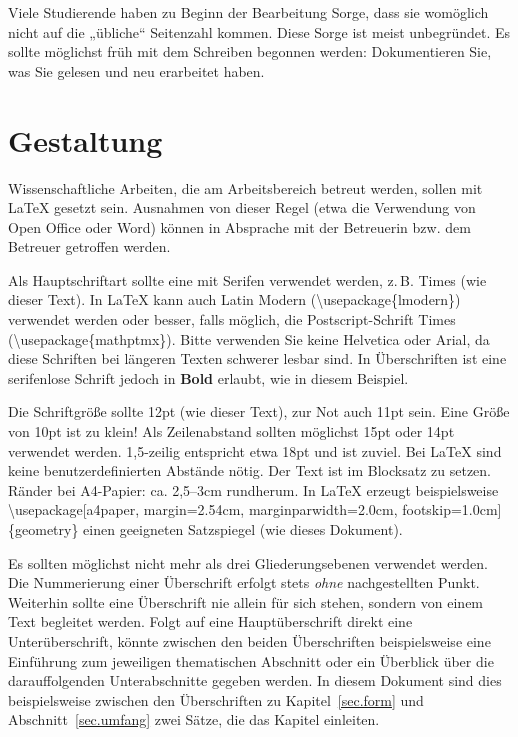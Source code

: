 \documentclass[
    fontsize=12pt,
    headings=small,
    parskip=half,           %
    bibliography=totoc,
    numbers=noenddot,       %
    open=any,               %
    ]{scrreprt}
\begin{document}
Viele Studierende haben zu Beginn der Bearbeitung Sorge, dass sie womöglich nicht auf die „übliche“ Seitenzahl kommen. Diese Sorge ist meist unbegründet. Es sollte möglichst früh mit dem Schreiben begonnen werden: Dokumentieren Sie, was Sie gelesen und neu erarbeitet haben.

\section{Gestaltung}

Wissenschaftliche Arbeiten, die am Arbeitsbereich betreut werden, sollen mit LaTeX gesetzt sein. Ausnahmen von dieser Regel (etwa die Verwendung von Open Office oder Word) können in Absprache mit der Betreuerin bzw. dem Betreuer getroffen werden.

Als Hauptschriftart sollte eine mit Serifen verwendet werden, z.\,B. Times (wie dieser Text). In LaTeX kann auch Latin Modern (\textbackslash usepackage\{lmodern\}) verwendet werden oder besser, falls möglich, die Postscript-Schrift Times (\textbackslash usepackage\{mathptmx\}). Bitte verwenden Sie keine \textsf{Helvetica} oder \textsf{Arial}, da diese Schriften bei längeren Texten schwerer lesbar sind. In Überschriften ist eine serifenlose Schrift jedoch in \textsf{\textbf{Bold}} erlaubt, wie in diesem Beispiel.

Die Schriftgröße sollte 12pt (wie dieser Text), zur Not auch 11pt sein. Eine Größe von 10pt ist zu klein! Als Zeilenabstand sollten möglichst 15pt oder 14pt verwendet werden. 1,5-zeilig entspricht etwa 18pt und ist zuviel. Bei LaTeX sind keine benutzerdefinierten Abstände nötig. Der Text ist im Blocksatz zu setzen. Ränder bei A4-Papier: ca. 2,5--3cm rundherum. In LaTeX erzeugt beispielsweise \textbackslash usepackage[a4paper, margin=2.54cm, marginparwidth=2.0cm, footskip=1.0cm]\{geometry\} einen geeigneten Satzspiegel (wie dieses Dokument).

Es sollten möglichst nicht mehr als drei Gliederungsebenen verwendet werden. Die Nummerierung einer Überschrift erfolgt stets \emph{ohne} nachgestellten Punkt. Weiterhin sollte eine Überschrift nie allein für sich stehen, sondern von einem Text begleitet werden. Folgt auf eine Hauptüberschrift direkt eine Unterüberschrift, könnte zwischen den beiden Überschriften beispielsweise eine Einführung zum jeweiligen thematischen Abschnitt oder ein Überblick über die darauffolgenden Unterabschnitte gegeben werden. In diesem Dokument sind dies beispielsweise zwischen den Überschriften zu Kapitel~\ref{sec.form} und Abschnitt~\ref{sec.umfang} zwei Sätze, die das Kapitel einleiten.
\end{document}
